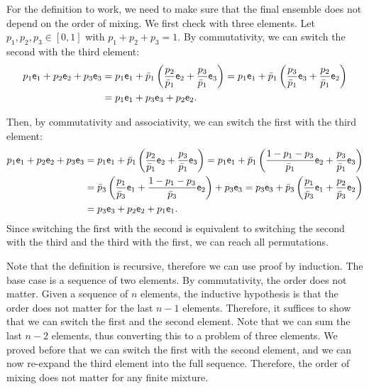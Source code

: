 \begin{check}
	For the definition to work, we need to make sure that the final ensemble does not depend on the order of mixing. We first check with three elements. Let $p_1, p_2, p_3 \in [0,1]$ with $p_1+p_2+p_3=1$. By commutativity, we can switch the second with the third element:
	\begin{equation}
	\begin{aligned}
		p_1 \ens[e]_1 + p_2 \ens[e]_2 + p_3 \ens_3 &= p_1 \ens_1 + \bar{p}_1\left(\frac{p_2}{\bar{p}_1}\ens_2 + \frac{p_3}{\bar{p}_1}\ens_3\right) = p_1 \ens_1 + \bar{p}_1\left(\frac{p_3}{\bar{p}_1} \ens_3 +  \frac{p_2}{\bar{p}_1}\ens_2\right) \\
		&= p_1 \ens[e]_1 + p_3 \ens[e]_3 + p_2 \ens_2.
	\end{aligned}
	\end{equation}
	
	Then, by commutativity and associativity, we can switch the first with the third element:
	\begin{equation}
		\begin{aligned}
	 p_1 \ens[e]_1 + p_2 \ens[e]_2 + p_3 \ens_3 &= p_1 \ens_1 + \bar{p}_1\left(\frac{p_2}{\bar{p}_1}\ens_2 + \frac{p_3}{\bar{p}_1}\ens_3\right) = p_1 \ens_1 + \bar{p}_1\left(\frac{1-p_1-p_3}{\bar{p}_1}\ens_2 + \frac{p_3}{\bar{p}_1}\ens_3\right) \\
	 &= \bar{p}_3\left(\frac{p_1}{\bar{p}_3} \ens_1 + \frac{1-p_1-p_3}{\bar{p}_3}\ens_2\right) + p_3 \ens_3 = p_3 \ens_3 + \bar{p}_3\left(\frac{p_1}{\bar{p}_3} \ens_1 + \frac{p_2}{\bar{p}_3}\ens_2\right) \\
	 &= p_3 \ens[e]_3 + p_2 \ens[e]_2 + p_1 \ens_1.
		\end{aligned}
	\end{equation}
	Since switching the first with the second is equivalent to switching the second with the third and the third with the first, we can reach all permutations.
	
	Note that the definition is recursive, therefore we can use proof by induction. The base case is a sequence of two elements. By commutativity, the order does not matter. Given a sequence of $n$ elements, the inductive hypothesis is that the order does not matter for the last $n-1$ elements. Therefore, it suffices to show that we can switch the first and the second element. Note that we can sum the last $n-2$ elements, thus converting this to a problem of three elements. We proved before that we can switch the first with the second element, and we can now re-expand the third element into the full sequence. Therefore, the order of mixing does not matter for any finite mixture. 
\end{check}

